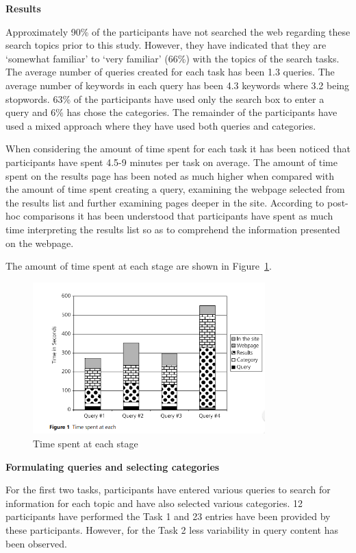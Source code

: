 \documentclass[]{article}
\begin{document}
\textbf{Results}

Approximately 90\% of the participants have not searched the web regarding these search topics prior to this study. However, they have indicated that they are ‘somewhat familiar’ to ‘very familiar’ (66\%) with the topics of the search tasks. The average number of queries created for each task has been 1.3 queries. The average number of keywords in each query has been 4.3 keywords where 3.2 being stopwords. 63\% of the participants have used only the search box to enter a query and 6\% has chose the categories. The remainder of the participants have used a mixed approach where they have used both queries and categories.       

When considering the amount of time spent for each task it has been noticed that participants have spent 4.5-9 minutes per task on average. The amount of time spent on the results page has been noted as much higher when compared with the amount of time spent creating a query, examining the webpage selected from the results list and further examining pages deeper in the site. According to post-hoc comparisons it has been understood that participants have spent as much time interpreting the results list so as to comprehend the information presented on the webpage.

The amount of time spent at each stage are shown in Figure~\ref{fig23}.

\begin{figure}[t!]
	\includegraphics[width=0.8\textwidth]{Capture23.png}
	\caption{ Time spent at each stage \label{fig23}}
\end{figure}    

\textbf{Formulating queries and selecting categories}

For the first two tasks, participants have entered various queries to search for information for each topic and have also selected various categories. 12 participants have performed the Task 1 and 23 entries have been provided by these participants. However, for the Task 2 less variability in query content has been observed. 
\end{document}
